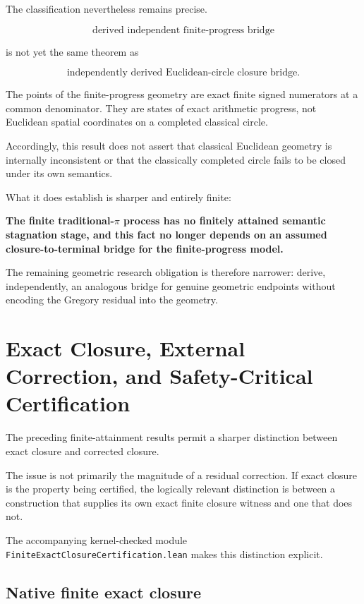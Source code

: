 \documentclass[11pt,a4paper]{article}
\begin{document}
The classification nevertheless remains precise.

\[
\boxed{
\text{derived independent finite-progress bridge}
}
\]

is not yet the same theorem as

\[
\boxed{
\text{independently derived Euclidean-circle closure bridge}.
}
\]

The points of the finite-progress geometry are exact finite signed
numerators at a common denominator. They are states of exact arithmetic
progress, not Euclidean spatial coordinates on a completed classical
circle.

Accordingly, this result does not assert that classical Euclidean
geometry is internally inconsistent or that the classically completed
circle fails to be closed under its own semantics.

What it does establish is sharper and entirely finite:

\begin{center}
\textbf{The finite traditional-\(\pi\) process has no finitely attained
semantic stagnation stage, and this fact no longer depends on an assumed
closure-to-terminal bridge for the finite-progress model.}
\end{center}

The remaining geometric research obligation is therefore narrower:
derive, independently, an analogous bridge for genuine geometric
endpoints without encoding the Gregory residual into the geometry.


\section{Exact Closure, External Correction, and Safety-Critical Certification}

The preceding finite-attainment results permit a sharper distinction
between exact closure and corrected closure.

The issue is not primarily the magnitude of a residual correction.
If exact closure is the property being certified, the logically relevant
distinction is between a construction that supplies its own exact
finite closure witness and one that does not.

The accompanying kernel-checked module
\texttt{FiniteExactClosureCertification.lean} makes this distinction
explicit.

\subsection{Native finite exact closure}
\end{document}
